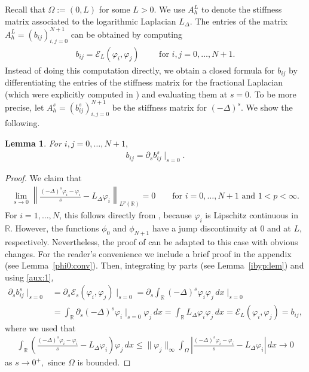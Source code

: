 \documentclass[10 pt]{article}
\newtheorem{lemma}[theorem]{Lemma}
\numberwithin{equation}{section}
\def\R{\mathbb{R}}
\def\cE{\mathcal{E}}
\begin{document}
Recall that $\Omega:=(0,L)$ for some $L>0$.  We use $A^L_h$ to denote the stiffness matrix associated to the logarithmic Laplacian $L_\Delta.$   The entries of the matrix $A^L_h=(b_{ij})_{i,j=0}^{N+1}$ can be obtained by computing
\begin{align*}
b_{ij}=\cE_L(\varphi_i,\varphi_j)\qquad \text{ for }i,j=0,\ldots,N+1.
\end{align*}
Instead of doing this computation directly, we obtain a closed formula for $b_{ij}$ by differentiating the entries of the stiffness matrix for the fractional Laplacian (which were explicitly computed in \cite{BH17}) and evaluating them at $s=0$.  To be more precise, let $A^s_h=(b_{ij}^s)_{i,j=0}^{N+1}$ be the stiffness matrix for $(-\Delta)^s$. We show the following. 
\begin{lemma}\label{lem:derivative:s:m} For $i,j=0,\ldots,N+1,$
\begin{align*}
    b_{ij}=\partial_s b_{ij}^s \mid_{s=0}.
\end{align*}
\end{lemma}
\begin{proof}
We claim that 
\begin{align}\label{aux:1}
\lim_{s\to 0}\left\|\frac{(-\Delta)^s \varphi_i-\varphi_i}{s}-L_\Delta \varphi_i    \right\|_{L^p(\R)}=0\qquad \text{for $i=0,\ldots,N+1$ and $1<p<\infty$.}
\end{align}
For $i=1,\ldots,N$, this follows directly from \cite[Theorem 1.1]{CW19}, because $\varphi_i$ is Lipschitz continuous in $\R$.  However, the functions $\phi_0$ and $\phi_{N+1}$ have a jump discontinuity at 0 and at $L$, respectively.  Nevertheless, the proof of \cite[Theorem 1.1]{CW19} can be adapted to this case with obvious changes.  For the reader's convenience we include a brief proof in the appendix (see Lemma~\ref{phi0:conv}). Then, integrating by parts (see Lemma~\ref{ibyp:lem}) and using \eqref{aux:1},
\begin{align*}
\partial_s b_{ij}^s\mid_{s=0}&=\partial_s\cE_s(\varphi_i,\varphi_j)\mid_{s=0}=
\partial_s\int_{\R} (-\Delta)^s\varphi_i \varphi_j\, dx\mid_{s=0}\\
&=\int_{\R} \partial_s(-\Delta)^s\varphi_i\mid_{s=0} \varphi_j\, dx
=\int_{\R} L_\Delta\varphi_i \varphi_j\, dx
=\cE_L(\varphi_i,\varphi_j)=b_{ij},
\end{align*}
where we used that
\begin{align*}
\int_{\R}\left(\frac{(-\Delta)^s \varphi_i-\varphi_i}{s}-L_\Delta \varphi_i  \right)\varphi_j\, dx
\leq \|\varphi_j\|_\infty\int_{\Omega}\left|\frac{(-\Delta)^s \varphi_i-\varphi_i}{s}-L_\Delta \varphi_i  \right|\, dx\to 0
\end{align*}
as $s\to 0^+,$ since $\Omega$ is bounded.
\end{proof}
\end{document}
